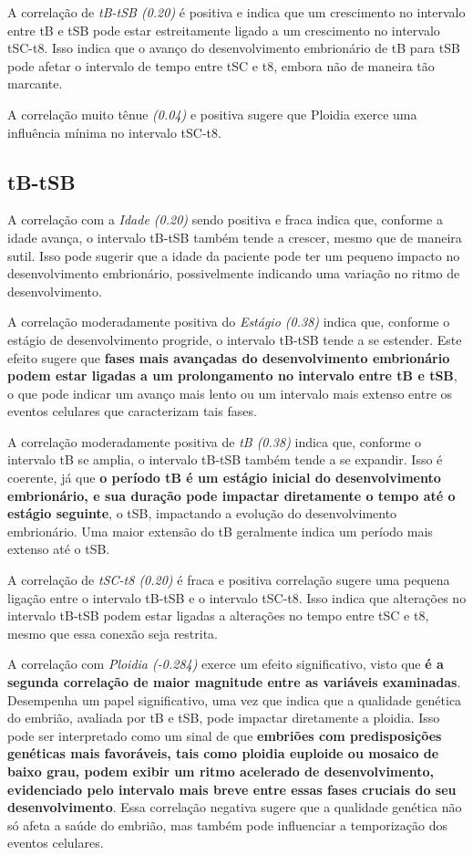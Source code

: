 A correlação de \textit{tB-tSB (0.20)} é positiva e indica que um crescimento no intervalo entre tB e tSB pode estar estreitamente ligado a um crescimento no intervalo tSC-t8. Isso indica que o avanço do desenvolvimento embrionário de tB para tSB pode afetar o intervalo de tempo entre tSC e t8, embora não de maneira tão marcante.

A correlação muito tênue \textit{(0.04)} e positiva sugere que Ploidia exerce uma influência mínima no intervalo tSC-t8. 

\subsection*{tB-tSB}
A correlação com a \textit{Idade (0.20)} sendo positiva e fraca indica que, conforme a idade avança, o intervalo tB-tSB também tende a crescer, mesmo que de maneira sutil. Isso pode sugerir que a idade da paciente pode ter um pequeno impacto no desenvolvimento embrionário, possivelmente indicando uma variação no ritmo de desenvolvimento.

A correlação moderadamente positiva do \textit{Estágio (0.38)} indica que, conforme o estágio de desenvolvimento progride, o intervalo tB-tSB tende a se estender. Este efeito sugere que \textbf{fases mais avançadas do desenvolvimento embrionário podem estar ligadas a um prolongamento no intervalo entre tB e tSB}, o que pode indicar um avanço mais lento ou um intervalo mais extenso entre os eventos celulares que caracterizam tais fases.

A correlação moderadamente positiva de \textit{tB (0.38)} indica que, conforme o intervalo tB se amplia, o intervalo tB-tSB também tende a se expandir. Isso é coerente, já que \textbf{o período tB é um estágio inicial do desenvolvimento embrionário, e sua duração pode impactar diretamente o tempo até o estágio seguinte}, o tSB, impactando a evolução do desenvolvimento embrionário. Uma maior extensão do tB geralmente indica um período mais extenso até o tSB.

A correlação de \textit{tSC-t8 (0.20)} é fraca e positiva correlação sugere uma pequena ligação entre o intervalo tB-tSB e o intervalo tSC-t8. Isso indica que alterações no intervalo tB-tSB podem estar ligadas a alterações no tempo entre tSC e t8, mesmo que essa conexão seja restrita. 

A correlação com \textit{Ploidia (-0.284)} exerce um efeito significativo, visto que \textbf{é a segunda correlação de maior magnitude entre as variáveis examinadas}. Desempenha um papel significativo, uma vez que indica que a qualidade genética do embrião, avaliada por tB e tSB, pode impactar diretamente a ploidia. Isso pode ser interpretado como um sinal de que \textbf{embriões com predisposições genéticas mais favoráveis, tais como ploidia euploide ou mosaico de baixo grau, podem exibir um ritmo acelerado de desenvolvimento, evidenciado pelo intervalo mais breve entre essas fases cruciais do seu desenvolvimento}. Essa correlação negativa sugere que a qualidade genética não só afeta a saúde do embrião, mas também pode influenciar a temporização dos eventos celulares. 

